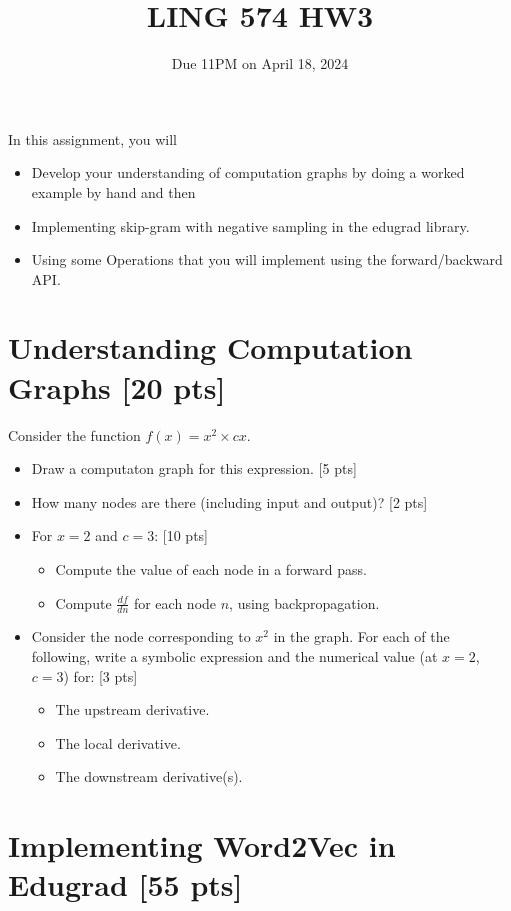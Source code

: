 \documentclass[11pt]{article}
\begin{document}
\title{LING 574 HW3}
\date{\vspace{-0.2in}Due 11PM on April 18, 2024}
\maketitle


\noindent In this assignment, you will 
\begin{itemize}
  \item Develop your understanding of computation graphs by doing a worked example by hand and then
  \item Implementing skip-gram with negative sampling in the edugrad library.
  \item Using some Operations that you will implement using the forward/backward API.
\end{itemize}


\section{Understanding Computation Graphs [20 pts]}

  Consider the function $f(x) = x^2 \times cx$.
\begin{itemize}
  \item Draw a computaton graph for this expression. [5 pts]
  \item How many nodes are there (including input and output)? [2 pts]
  \item For $x = 2$ and $c=3$: [10 pts]
    \begin{itemize}
      \item Compute the value of each node in a forward pass.
      \item Compute $\frac{df}{dn}$ for each node $n$, using backpropagation.
    \end{itemize}
  \item Consider the node corresponding to $x^2$ in the graph.  For each of the following, write a symbolic expression and the numerical value (at $x=2$, $c=3$) for: [3 pts]
    \begin{itemize}
      \item The upstream derivative.
      \item The local derivative.
      \item The downstream derivative(s).
    \end{itemize}
\end{itemize}

\section{Implementing Word2Vec in Edugrad [55 pts]}
\end{document}

